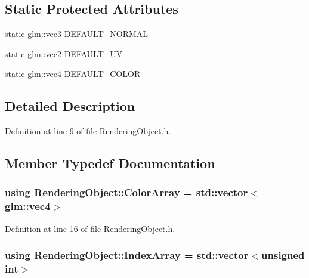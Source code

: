 \subsection*{Static Protected Attributes}
\begin{DoxyCompactItemize}
\item 
static glm\+::vec3 \hyperlink{class_rendering_object_af270a476ba12c23fefbb034e21930add}{D\+E\+F\+A\+U\+L\+T\+\_\+\+N\+O\+R\+M\+A\+L}
\item 
static glm\+::vec2 \hyperlink{class_rendering_object_a3dcb28a12f578630aea75cc59ea39588}{D\+E\+F\+A\+U\+L\+T\+\_\+\+U\+V}
\item 
static glm\+::vec4 \hyperlink{class_rendering_object_a3bf21996dc0ef604b2b81d95275c97f9}{D\+E\+F\+A\+U\+L\+T\+\_\+\+C\+O\+L\+O\+R}
\end{DoxyCompactItemize}


\subsection{Detailed Description}


Definition at line 9 of file Rendering\+Object.\+h.



\subsection{Member Typedef Documentation}
\hypertarget{class_rendering_object_a8a12e1f9be788d99af6c089e1c600022}{}
\subsubsection[{Color\+Array}]{\setlength{\rightskip}{0pt plus 5cm}using {\bf Rendering\+Object\+::\+Color\+Array} =  std\+::vector$<$glm\+::vec4$>$}\label{class_rendering_object_a8a12e1f9be788d99af6c089e1c600022}


Definition at line 16 of file Rendering\+Object.\+h.

\hypertarget{class_rendering_object_a9931c88bca3384065c6691dfe1e60af1}{}
\subsubsection[{Index\+Array}]{\setlength{\rightskip}{0pt plus 5cm}using {\bf Rendering\+Object\+::\+Index\+Array} =  std\+::vector$<$unsigned int$>$}\label{class_rendering_object_a9931c88bca3384065c6691dfe1e60af1}


